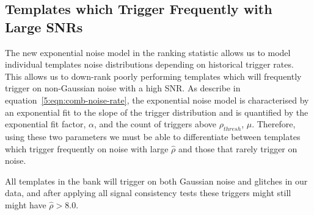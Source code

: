 \subsection{\label{5:sec:poor-temp-fits}Templates which Trigger Frequently with Large SNRs}



The new exponential noise model in the ranking statistic allows us to model individual templates noise distributions depending on historical trigger rates. This allows us to down-rank poorly performing templates which will frequently trigger on non-Gaussian noise with a high SNR. As describe in equation~\ref{5:eqn:comb-noise-rate}, the exponential noise model is characterised by an exponential fit to the slope of the trigger distribution and is quantified by the exponential fit factor, $\alpha$, and the count of triggers above $\rho_{thresh}$, $\mu$. Therefore, using these two parameters we must be able to differentiate between templates which trigger frequently on noise with large $\hat{\rho}$ and those that rarely trigger on noise.

All templates in the bank will trigger on both Gaussian noise and glitches in our data, and after applying all signal consistency tests these triggers might still might have $\hat{\rho} > 8.0$. 

